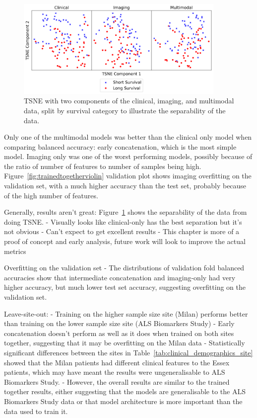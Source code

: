 \begin{figure}
    \centering
    \includegraphics[width=0.9\textwidth]{figures/tsne_plot}
    \caption{TSNE with two components of the clinical, imaging, and multimodal data, split by survival category to illustrate the separability of the data.}
    \label{fig:tsne}
\end{figure}

Only one of the multimodal models was better than the clinical only model when comparing balanced accuracy: early concatenation, which is the most simple model.
Imaging only was one of the worst performing models, possibly because of the ratio of number of features to number of samples being high.
Figure~\ref{fig:trainedtogetherviolin} validation plot shows imaging overfitting on the validation set, with a much higher accuracy than the test set, probably because of the high number of features.

Generally, results aren't great: Figure~\ref{fig:tsne} shows the separability of the data from doing TSNE.
- Visually looks like clinical-only has the best separation but it's not obvious
- Can't expect to get excellent results
- This chapter is more of a proof of concept and early analysis, future work will look to improve the actual metrics


Overfitting on the validation set
- The distributions of validation fold balanced accuracies show that intermediate concatenation and imaging-only had very higher accuracy, but much lower test set accuracy, suggesting overfitting on the validation set.

Leave-site-out:
- Training on the higher sample size site (Milan) performs better than training on the lower sample size site (ALS Biomarkers Study)
- Early concatenation doesn't perform as well as it does when trained on both sites together, suggesting that it may be overfitting on the Milan data
- Statistically significant differences between the sites in Table~\ref{tab:clinical_demographics_site} showed that the Milan patients had different clinical features to the Essex patients, which may have meant the results were ungeneralisable to ALS Biomarkers Study.
- However, the overall results are similar to the trained together results, either suggesting that the models are generalisable to the ALS Biomarkers Study data or that model architecture is more important than the data used to train it.

